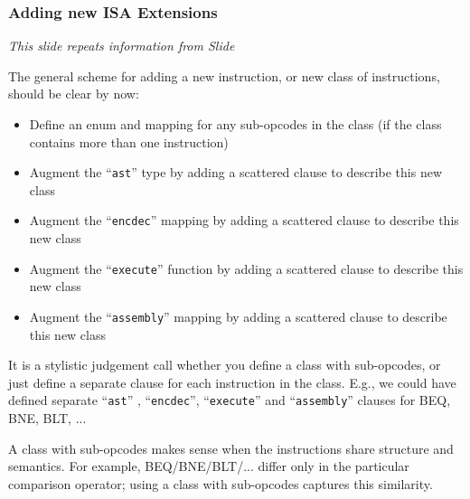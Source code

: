 \documentclass[aspectratio=169]{beamer}
\newcommand{\slidefont}{\scriptsize}
\newcommand{\cf}{\scriptsize\tt}
\begin{document}

\begin{frame}[fragile]
  \frametitle{Adding new ISA Extensions}

  \slidefont

  \emph{This slide repeats information from Slide \pageref{slide-taking-stock-1}}

  The general scheme for adding a new instruction, or new class of instructions, should be clear by now:
  \begin{itemize}
    \item Define an enum and mapping for any sub-opcodes in the class
      (if the class contains more than one instruction)
    \item Augment the ``{\cf ast}'' type by adding a scattered clause to describe this new class
    \item Augment the ``{\cf encdec}'' mapping by adding a scattered clause to describe this new class
    \item Augment the ``{\cf execute}'' function by adding a scattered clause to describe this new class
    \item Augment the ``{\cf assembly}'' mapping by adding a scattered clause to describe this new class
  \end{itemize}

  \vspace{1ex}

  It is a stylistic judgement call whether you define a class with
  sub-opcodes, or just define a separate clause for each instruction
  in the class.  E.g., we could have defined separate ``{\cf ast}'' ,
  ``{\cf encdec}'', ``{\cf execute}'' and ``{\cf assembly}'' clauses
  for BEQ, BNE, BLT, ...

  \vspace{1ex}

  A class with sub-opcodes makes sense when the instructions share
  structure and semantics.  For example, BEQ/BNE/BLT/... differ only
  in the particular comparison operator; using a class with
  sub-opcodes captures this similarity.

  \vspace{1ex}

\end{frame}

\end{document}
